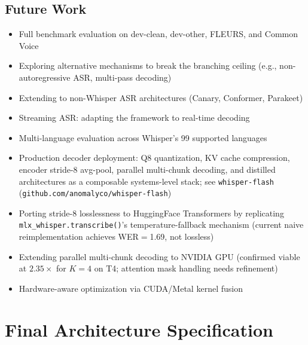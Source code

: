\documentclass[11pt,a4paper]{article}
\begin{document}
\subsection*{Future Work}
\begin{itemize}[leftmargin=*,itemsep=2pt]
    \item Full benchmark evaluation on dev-clean, dev-other, FLEURS, and Common Voice
    \item Exploring alternative mechanisms to break the branching ceiling (e.g., non-autoregressive ASR, multi-pass decoding)
    \item Extending to non-Whisper ASR architectures (Canary, Conformer, Parakeet)
    \item Streaming ASR: adapting the framework to real-time decoding
    \item Multi-language evaluation across Whisper's 99 supported languages
    \item Production decoder deployment: Q8 quantization, KV cache compression, encoder stride-8 avg-pool, parallel multi-chunk decoding, and distilled architectures as a composable systems-level stack; see \texttt{whisper-flash} (\texttt{github.com/anomalyco/whisper-flash})
    \item Porting stride-8 losslessness to HuggingFace Transformers by replicating \texttt{mlx\_whisper.transcribe()}'s temperature-fallback mechanism (current naive reimplementation achieves WER$=$1.69, not lossless)
    \item Extending parallel multi-chunk decoding to NVIDIA GPU (confirmed viable at $2.35\times$ for $K=4$ on T4; attention mask handling needs refinement)
    \item Hardware-aware optimization via CUDA/Metal kernel fusion
\end{itemize}


\appendix

\section{Final Architecture Specification}
\label{app:arch}
\end{document}
